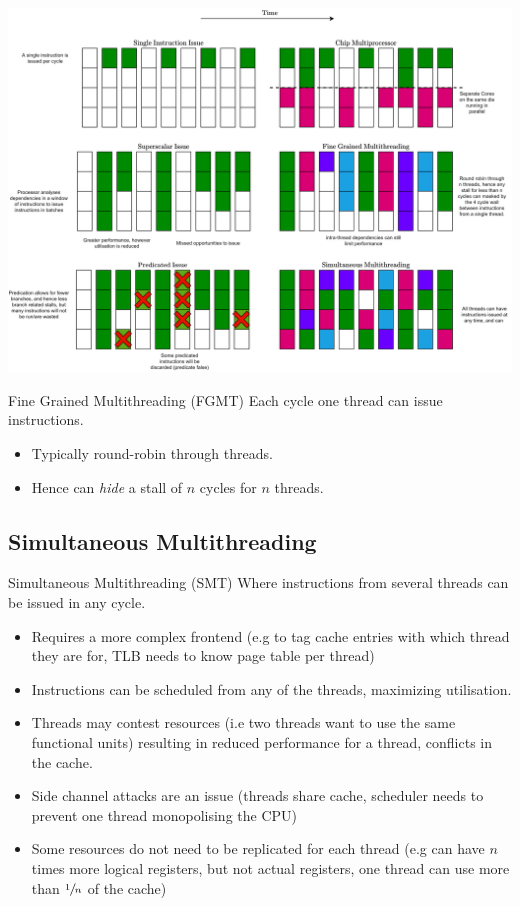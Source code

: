 \begin{center}
	\includegraphics[width=\textwidth]{exploiting_parallelism/images/issues.drawio.png}
\end{center}
\begin{definitionbox}{Fine Grained Multithreading (FGMT)}
	Each cycle one thread can issue instructions.
	\begin{itemize}
		\item Typically round-robin through threads.
		\item Hence can \textit{hide} a stall of $n$ cycles for $n$ threads.
	\end{itemize}
\end{definitionbox}

\subsection{Simultaneous Multithreading}
\begin{definitionbox}{Simultaneous Multithreading (SMT)}
	Where instructions from several threads can be issued in any cycle.
	\begin{itemize}
		\item Requires a more complex frontend (e.g to tag cache entries with which thread they are for, TLB needs to know page table per thread)
		\item Instructions can be scheduled from any of the threads, maximizing utilisation.
		\item Threads may contest resources (i.e two threads want to use the same functional units) resulting in reduced performance for a thread, conflicts in the cache.
		\item Side channel attacks are an issue (threads share cache, scheduler needs to prevent one thread monopolising the CPU)
		\item Some resources do not need to be replicated for each thread (e.g can have $n$ times more logical registers, but not actual registers, one thread can use more than $\sfrac{1}{n}$ of the cache)
	\end{itemize}
\end{definitionbox}

